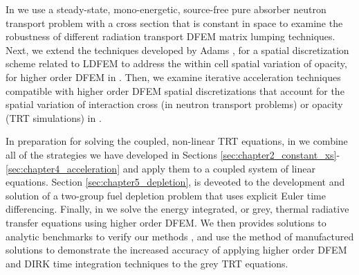 In  we use a steady-state, mono-energetic, source-free pure absorber neutron transport problem with a cross section that is constant in space to examine the robustness of different radiation transport DFEM matrix lumping techniques.
Next, we extend the techniques developed by Adams \cite{adams_scb,adams_nowak}, for a spatial discretization scheme related to LDFEM  to address the within cell spatial variation of opacity, for higher order DFEM in  .
Then, we examine iterative acceleration techniques compatible with higher order DFEM spatial discretizations that account for the spatial variation of interaction cross (in neutron transport problems) or opacity (TRT simulations) in .

In preparation for solving the coupled, non-linear TRT equations, in  we combine all of the strategies we have developed in Sections \ref{sec:chapter2_constant_xs}-\ref{sec:chapter4_acceleration} and apply them to a coupled system of linear equations. 
Section \ref{sec:chapter5_depletion}, is deveoted to the development and solution of a two-group fuel depletion problem that uses explicit Euler time differencing.
Finally, in  we solve the energy integrated, or grey, thermal radiative transfer equations using higher order DFEM. 
We then provides solutions to analytic benchmarks to verify our methods \cite{su_olson_1}, and use the method of manufactured solutions \cite{mms} to demonstrate the increased accuracy of applying higher order DFEM and DIRK time integration techniques to the grey TRT equations.
